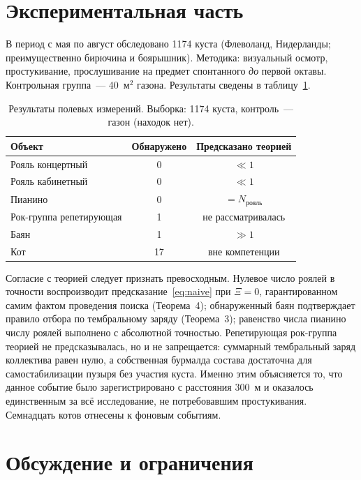 \documentclass[11pt,a4paper]{article}
\begin{document}
\section{Экспериментальная часть}

В период с мая по август обследовано 1174 куста (Флеволанд, Нидерланды; преимущественно бирючина и боярышник). Методика: визуальный осмотр, простукивание, прослушивание на предмет спонтанного \emph{до} первой октавы. Контрольная группа~--- 40~м$^2$ газона. Результаты сведены в таблицу~\ref{tab:field}.

\begin{table}[htbp]
\centering
\begin{tabular}{lcc}
\toprule
Объект & Обнаружено & Предсказано теорией \\
\midrule
Рояль концертный        & 0  & $\ll 1$ \\
Рояль кабинетный        & 0  & $\ll 1$ \\
Пианино                 & 0  & $= N_{\text{рояль}}$ \\
Рок-группа репетирующая & 1  & не рассматривалась \\
Баян                    & 1  & $\gg 1$ \\
Кот                     & 17 & вне компетенции \\
\bottomrule
\end{tabular}
\caption{Результаты полевых измерений. Выборка: 1174 куста, контроль~--- газон (находок нет).}
\label{tab:field}
\end{table}

Согласие с теорией следует признать превосходным. Нулевое число роялей в точности воспроизводит предсказание~\eqref{eq:naive} при $\Xi = 0$, гарантированном самим фактом проведения поиска (Теорема~4); обнаруженный баян подтверждает правило отбора по тембральному заряду (Теорема~3); равенство числа пианино числу роялей выполнено с абсолютной точностью. Репетирующая рок-группа теорией не предсказывалась, но и не запрещается: суммарный тембральный заряд коллектива равен нулю, а собственная бурмалда состава достаточна для самостабилизации пузыря без участия куста. Именно этим объясняется то, что данное событие было зарегистрировано с расстояния 300~м и оказалось единственным за всё исследование, не потребовавшим простукивания. Семнадцать котов отнесены к фоновым событиям.

\section{Обсуждение и ограничения}
\end{document}
